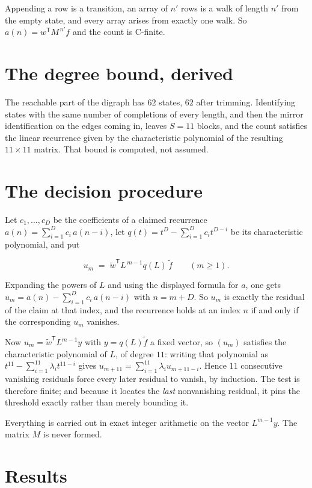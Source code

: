 \documentclass[11pt]{article}
\theoremstyle{definition}
\begin{document}
Appending a row is a transition, an array of $n'$ rows is a walk of length $n'$ from the empty state, and every array arises from exactly one walk. So $a(n) = w^{\mathsf T}M^{\,n'}f$ and the count is C-finite.

\section{The degree bound, derived}

The reachable part of the digraph has $62$ states, $62$ after trimming. Identifying states with the same number of completions of every length, and then the mirror identification on the edges coming in, leaves $S = 11$ blocks, and the count satisfies the linear recurrence given by the characteristic polynomial of the resulting $11\times11$ matrix. That bound is computed, not assumed.

\section{The decision procedure}

Let $c_1,\dots,c_D$ be the coefficients of a claimed recurrence $a(n) = \sum_{i=1}^{D} c_i\,a(n-i)$, let $q(t) = t^{D} - \sum_{i=1}^{D} c_i t^{D-i}$ be its characteristic polynomial, and put

\[u_m \;=\; \tilde w^{\mathsf T} L^{\,m-1} q(L)\,\tilde f \qquad (m \ge 1).\]

Expanding the powers of $L$ and using the displayed formula for $a$, one gets $u_m = a(n) - \sum_{i=1}^{D} c_i\,a(n-i)$ with $n = m + D$. So $u_m$ is exactly the residual of the claim at that index, and the recurrence holds at an index $n$ if and only if the corresponding $u_m$ vanishes.

Now $u_m = \tilde w^{\mathsf T} L^{m-1} y$ with $y = q(L)\tilde f$ a fixed vector, so $(u_m)$ satisfies the characteristic polynomial of $L$, of degree $11$: writing that polynomial as $t^{11} - \sum_{i=1}^{11} \lambda_i t^{11-i}$ gives $u_{m+11} = \sum_{i=1}^{11} \lambda_i u_{m+11-i}$. Hence $11$ consecutive vanishing residuals force every later residual to vanish, by induction. The test is therefore finite; and because it locates the {\itshape last} nonvanishing residual, it pins the threshold exactly rather than merely bounding it.

Everything is carried out in exact integer arithmetic on the vector $L^{m-1}y$. The matrix $M$ is never formed.

\section{Results}
\end{document}
